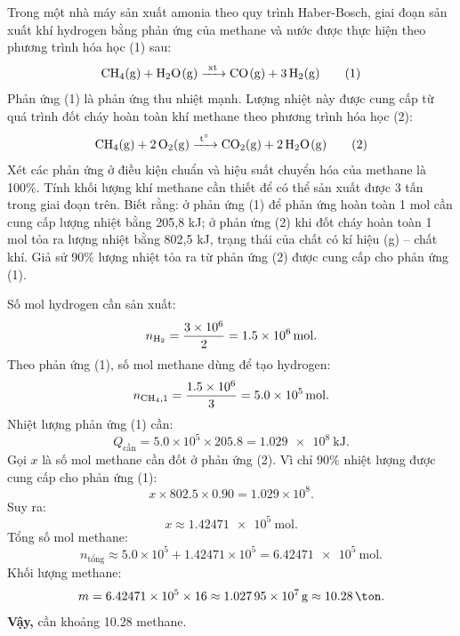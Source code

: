 \begin{tuluyen}
Trong một nhà máy sản xuất amonia theo quy trình Haber-Bosch, giai đoạn sản xuất khí hydrogen bằng phản ứng của methane và nước được thực hiện theo phương trình hóa học (1) sau:
\[
\ce{CH4(g) + H2O(g) ->[xt] CO(g) + 3H2(g)} \tag{1}
\]
Phản ứng (1) là phản ứng thu nhiệt mạnh. Lượng nhiệt này được cung cấp từ quá trình đốt cháy hoàn toàn khí methane theo phương trình hóa học (2):
\[
\ce{CH4(g) + 2O2(g) ->[t^\circ] CO2(g) + 2H2O(g)} \tag{2}
\]
Xét các phản ứng ở điều kiện chuẩn và hiệu suất chuyển hóa của methane là 100\%. Tính khối lượng khí methane cần thiết để có thể sản xuất được 3 tấn  trong giai đoạn trên. Biết rằng: ở phản ứng (1) để phản ứng hoàn toàn 1 mol  cần cung cấp lượng nhiệt bằng 205,8 kJ; ở phản ứng (2) khi đốt cháy hoàn toàn 1 mol  tỏa ra lượng nhiệt bằng 802,5 kJ, trạng thái của chất có kí hiệu (g) -- chất khí. Giả sử 90\% lượng nhiệt tỏa ra từ phản ứng (2) được cung cấp cho phản ứng (1).
\begin{loigiaiBT}
Số mol hydrogen cần sản xuất:
\[
n_{\ce{H2}}=\frac{3\times10^6}{2}=\SI{1.5e6}{\mole}.
\]
Theo phản ứng (1), số mol methane dùng để tạo hydrogen:
\[
n_{\ce{CH4},1}=\frac{1.5\times10^6}{3}=\SI{5.0e5}{\mole}.
\]
Nhiệt lượng phản ứng (1) cần:
\[
Q_{\text{cần}}=5.0\times10^5\times205.8=\SI{1.029e8}{\kilo\joule}.
\]
Gọi $x$ là số mol methane cần đốt ở phản ứng (2). Vì chỉ $90\%$ nhiệt lượng được cung cấp cho phản ứng (1):
\[
x\times802.5\times0.90=1.029\times10^8.
\]
Suy ra:
\[
x\approx\SI{1.42471e5}{\mole}.
\]
Tổng số mol methane:
\[
n_{\text{tổng}}\approx5.0\times10^5+1.42471\times10^5
=\SI{6.42471e5}{\mole}.
\]
Khối lượng methane:
\[
m=6.42471\times10^5\times16\approx\SI{1.02795e7}{\gram}
\approx\SI{10.28}{\ton}.
\]
\textbf{Vậy,} cần khoảng \SI{10.28}{\ton} methane.
\end{loigiaiBT}
\end{tuluyen}
